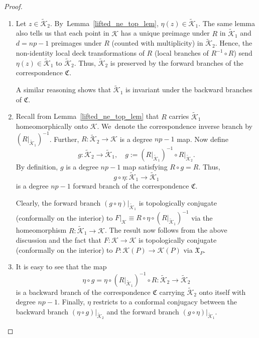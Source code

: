 \documentclass[JEP,XML,SOM,Unicode,NoFloatCountersInSection,published]{cedram}
\theoremstyle{definition}
\theoremstyle{remark}
\newcommand{\cK}{\mathcal{K}}
\begin{document}
\pagebreak[2]
\skpt
\begin{proof}
\begin{enumerate}
\item
Let $z\in\widetilde{\mathcal{K}}_2$. By~Lemma~\ref{lifted_ne_top_lem}, $\eta(z)\in \widetilde{\mathcal{K}}_1$. The same lemma also tells us that each point in $\cK$ has a unique preimage under $R$ in $\widetilde{\mathcal{K}}_1$ and $d=np-1$ preimages under $R$ (counted with multiplicity) in $\widetilde{\mathcal{K}}_2$. Hence, the non-identity local deck transformations of $R$ (\ie local branches of $R^{-1}\circ R$) send $\eta(z)\in\widetilde{\mathcal{K}}_1$ to $\widetilde{\mathcal{K}}_2$. Thus, $\widetilde{\mathcal{K}}_2$ is preserved by the forward branches of the correspondence $\mathfrak{C}$.

A similar reasoning shows that $\widetilde{\mathcal{K}}_1$ is invariant under the backward branches of $\mathfrak{C}$.

\item
Recall from Lemma~\ref{lifted_ne_top_lem} that $R$ carries $\widetilde{\cK}_1$ homeomorphically onto $\cK$. We~denote the correspondence inverse branch by $(R\vert_{\widetilde{\mathcal{K}}_1})^{-1}$. Further, $R:\widetilde{\cK}_2\to\cK$ is a degree $np-1$ map. Now define
\begin{equation*}
g:\widetilde{\cK}_2\to\widetilde{\cK}_1,\quad g:=(R\vert_{\widetilde{\mathcal{K}}_1})^{-1}\circ R\vert_{\widetilde{\cK}_2}.
\end{equation*}
By definition, $g$ is a degree $np-1$ map satisfying $R\circ g=R$. Thus,
\[
g\circ\eta:\widetilde{\mathcal{K}}_1\to\widetilde{\mathcal{K}}_1
\]
is a degree $np-1$ forward branch of the correspondence $\mathfrak{C}$.

Clearly, the forward branch $(g\circ\eta)\vert_{\widetilde{\mathcal{K}}_1}$ is topologically conjugate (conformally on the interior) to $F\vert_{\mathcal{K}}\equiv R\circ\eta\circ (R\vert_{\widetilde{\mathcal{K}}_1})^{-1}$ via the homeomorphism $R:\widetilde{\mathcal{K}}_1\to \mathcal{K}$. The result now follows from the above discussion and the fact that $F:\cK\to\cK$ is topologically conjugate (conformally on the interior) to $P:\cK(P)\to\cK(P)$ via $\mathfrak{X}_P$.

\item
It is easy to see that the map
\[
\eta\circ g=\eta\circ(R\vert_{\widetilde{\cK}_1})^{-1}\circ R: \widetilde{\mathcal{K}}_2\to\widetilde{\mathcal{K}}_2
\]
is a backward branch of the correspondence $\mathfrak{C}$ carrying $\widetilde{\mathcal{K}}_2$ onto itself with degree $np-1$.
Finally, $\eta$ restricts to a conformal conjugacy between the backward branch $(\eta\circ g)\vert_{\widetilde{\mathcal{K}}_2}$ and the forward branch $(g\circ\eta)\vert_{\widetilde{\mathcal{K}}_1}$.
\qedhere
\end{enumerate}
\end{proof}
\end{document}
